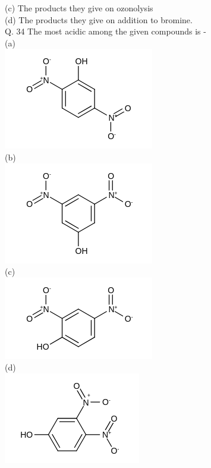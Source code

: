 \documentclass[10pt]{article}
\begin{document}
(c) The products they give on ozonolysis\\
(d) The products they give on addition to bromine.\\
Q. 34 The most acidic among the given compounds is -\\
(a)\\
\includegraphics{smile-eca71f69ba80ffb58c45ce7f0f074d5091d54b98}\\
(b)\\
\includegraphics{smile-349d0e7f2d57a8f6413b2126c860b815826fe0bc}\\
(c)\\
\includegraphics{smile-51eb99879fa73d18d26d31c47b273ee5c525888f}\\
(d)\\
\includegraphics{smile-c58659eb4c52941cf816e1f0709dca4baf573d3e}\\
\end{document}
